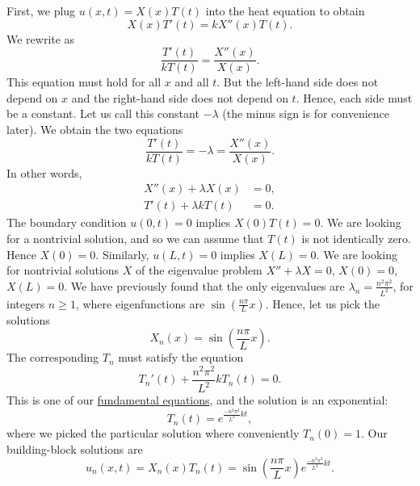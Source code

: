 First, we plug $u(x,t) = X(x)T(t)$ into the heat equation to
obtain
\begin{equation*}
X(x)T'(t) = k X''(x)T(t) .
\end{equation*}
We rewrite as
\begin{equation*}
\frac{T'(t)}{k T(t)} =
\frac{X''(x)}{X(x)} .
\end{equation*}
This equation must hold for all $x$ and all $t$.  But the
left-hand side does not depend on $x$ and the right-hand side does not
depend on $t$.  Hence, each side must be a constant.  Let us call this
constant $-\lambda$ (the minus sign is for convenience later).
We obtain the two equations
\begin{equation*}
\frac{T'(t)}{k T(t)} = -\lambda =
\frac{X''(x)}{X(x)} .
\end{equation*}
In other words,
\begin{align*}
X''(x) + \lambda X(x) &= 0 , \\
T'(t) + \lambda k T(t) &= 0 .
\end{align*}
The boundary condition $u(0,t) = 0$ implies $X(0)T(t) = 0$.  We are looking
for a nontrivial solution, and so we can assume that $T(t)$ is not identically
zero.  Hence $X(0) = 0$.  Similarly, $u(L,t) = 0$ implies $X(L) = 0$.  We
are looking for nontrivial solutions $X$ of the eigenvalue problem
$X'' + \lambda X = 0$, $X(0) = 0$, $X(L) = 0$.  We have previously found that
the only eigenvalues are $\lambda_n = \frac{n^2 \pi^2}{L^2}$, for integers
$n \geq 1$,
where eigenfunctions are $\sin \left(\frac{n \pi}{L} x\right)$.  Hence, let us pick
the solutions
\begin{equation*}
X_n (x) = \sin \left(\frac{n \pi}{L} x \right) .
\end{equation*}
The corresponding $T_n$ must satisfy the equation
\begin{equation*}
T_n'(t) + \frac{n^2 \pi^2}{L^2} k T_n(t) = 0 .
\end{equation*}
This is one of our
\hyperref[subsection:fourfundamental]{fundamental equations},
and the solution is
an exponential:
\begin{equation*}
T_n(t) = e^{\frac{-n^2 \pi^2}{L^2} k t} ,
\end{equation*}
where we picked the particular solution
where conveniently $T_n(0) = 1$.
Our building-block solutions are
\begin{equation*}
u_n(x,t) = X_n(x)T_n(t) =
\sin \left( \frac{n \pi}{L} x \right)
e^{\frac{-n^2 \pi^2}{L^2} k t} .
\end{equation*}

